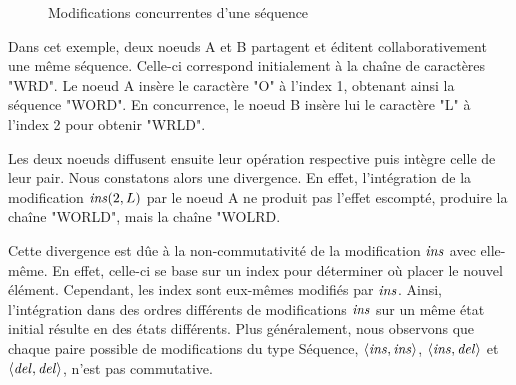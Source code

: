 \begin{figure}[!ht]
{
  }
  \caption{Modifications concurrentes d'une séquence}
  \label{fig:seq-conflit}
\end{figure}

Dans cet exemple, deux noeuds A et B partagent et éditent collaborativement une même séquence.
Celle-ci correspond initialement à la chaîne de caractères "WRD".
Le noeud A insère le caractère "O" à l'index 1, obtenant ainsi la séquence "WORD".
En concurrence, le noeud B insère lui le caractère "L" à l'index 2 pour obtenir "WRLD".

Les deux noeuds diffusent ensuite leur opération respective puis intègre celle de leur pair.
Nous constatons alors une divergence.
En effet, l'intégration de la modification $\mathit{ins}(2,L)$ par le noeud A ne produit pas l'effet escompté, \ie produire la chaîne "WORLD", mais la chaîne "WOLRD.

Cette divergence est dûe à la non-commutativité de la modification $\mathit{ins}$ avec elle-même.
En effet, celle-ci se base sur un index pour déterminer où placer le nouvel élément.
Cependant, les index sont eux-mêmes modifiés par $\mathit{ins}$.
Ainsi, l'intégration dans des ordres différents de modifications $\mathit{ins}$ sur un même état initial résulte en des états différents.
Plus généralement, nous observons que chaque paire possible de modifications du type Séquence, \ie $\langle \mathit{ins},\mathit{ins} \rangle$, $\langle \mathit{ins},\mathit{del} \rangle$ et $\langle \mathit{del},\mathit{del} \rangle$, n'est pas commutative.

